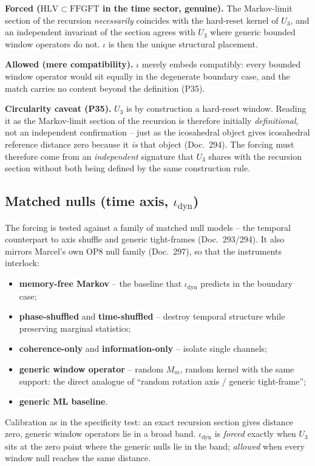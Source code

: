 \textbf{Forced ($\mathrm{HLV}\subset\mathrm{FFGFT}$ in the time sector,
genuine).} The Markov-limit section of the recursion \emph{necessarily}
coincides with the hard-reset kernel of $U_3$, and an independent invariant
of the section agrees with $U_3$ where generic bounded window operators do
not. $\iota$ is then the unique structural placement.

\textbf{Allowed (mere compatibility).} $\iota$ merely embeds compatibly:
every bounded window operator would sit equally in the degenerate boundary
case, and the match carries no content beyond the definition (P35).

\textbf{Circularity caveat (P35).} $U_3$ is by construction a hard-reset
window. Reading it as the Markov-limit section of the recursion is therefore
initially \emph{definitional}, not an independent confirmation -- just as the
icosahedral object gives icosahedral reference distance zero because it
\emph{is} that object (Doc.~294). The forcing must therefore come from an
\emph{independent} signature that $U_3$ shares with the recursion section
without both being defined by the same construction rule.

\subsection*{Matched nulls (time axis, $\iota_{\text{dyn}}$)}

The forcing is tested against a family of matched null models -- the
temporal counterpart to axis shuffle and generic tight-frames
(Doc.~293/294). It also mirrors Marcel's own OP8 null family (Doc.~297), so
that the instruments interlock:
\begin{itemize}
  \item \textbf{memory-free Markov} -- the baseline that $\iota_{\text{dyn}}$
    predicts in the boundary case;
  \item \textbf{phase-shuffled} and \textbf{time-shuffled} -- destroy
    temporal structure while preserving marginal statistics;
  \item \textbf{coherence-only} and \textbf{information-only} -- isolate
    single channels;
  \item \textbf{generic window operator} -- random $M_m$, random kernel with
    the same support: the direct analogue of \enquote{random rotation axis /
    generic tight-frame};
  \item \textbf{generic ML baseline}.
\end{itemize}
Calibration as in the specificity test: an exact recursion section gives
distance zero, generic window operators lie in a broad band.
$\iota_{\text{dyn}}$ is \emph{forced} exactly when $U_3$ sits at the zero
point where the generic nulls lie in the band; \emph{allowed} when every
window null reaches the same distance.

